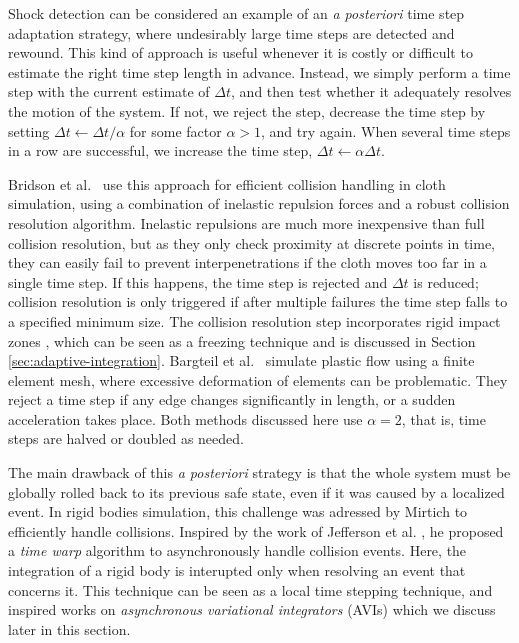 Shock detection can be considered an example of an \textit{a posteriori} time step adaptation strategy, where undesirably large time steps are detected and rewound.
This kind of approach is useful whenever it is costly or difficult to estimate the right time step length in advance.
Instead, we simply perform a time step with the current estimate of $\Delta t$, and then test whether it adequately resolves the motion of the system.
If not, we reject the step, decrease the time step by setting $\Delta t\gets\Delta t/\alpha$ for some factor $\alpha>1$, and try again.
When several time steps in a row are successful, we increase the time step, $\Delta t\gets\alpha\Delta t$.

Bridson et al.~\cite{Bridson2002} use this approach for efficient collision handling in cloth simulation, using a combination of inelastic repulsion forces and a robust collision resolution algorithm.
Inelastic repulsions are much more inexpensive than full collision resolution, but as they only check proximity at discrete points in time, they can easily fail to prevent interpenetrations if the cloth moves too far in a single time step.
If this happens, the time step is rejected and $\Delta t$ is reduced; collision resolution is only triggered if after multiple failures the time step falls to a specified minimum size.
The collision resolution step incorporates rigid impact zones \cite{Provot1997}, which can be seen as a freezing technique and is discussed in Section \ref{sec:adaptive-integration}.
Bargteil et al.~\cite{Bargteil2007} simulate plastic flow using a finite element mesh, where excessive deformation of elements can be problematic.
They reject a time step if any edge changes significantly in length, or a sudden acceleration takes place.
Both methods discussed here use $\alpha=2$, that is, time steps are halved or doubled as needed.

The main drawback of this \textit{a posteriori} strategy is that the whole system must be globally rolled back to its previous safe state, even if it was caused by a localized event.
In rigid bodies simulation, this challenge was adressed by Mirtich \cite{Mirtich2000} to efficiently handle collisions.
Inspired by the work of Jefferson et al. \cite{Jefferson1985}, he proposed a \emph{time warp} algorithm to asynchronously handle collision events.
Here, the integration of a rigid body is interupted only when resolving an event that concerns it.
This technique can be seen as a local time stepping technique, and inspired works on \emph{asynchronous variational integrators} (AVIs) which we discuss later in this section.


